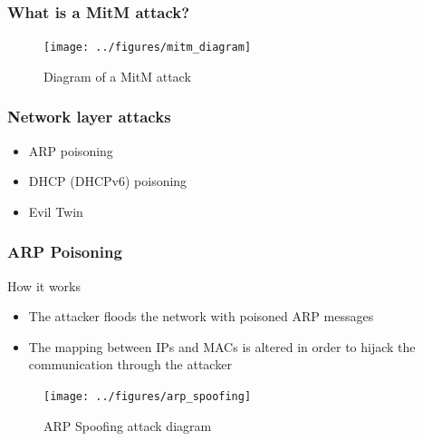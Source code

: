 \documentclass{beamer}
\begin{document}
\begin{frame}
  \frametitle{What is a MitM attack?}
  \begin{figure}
  \texttt{[image: ../figures/mitm\_diagram]}
  \caption*{Diagram of a MitM attack}
  \end{figure}

\end{frame}


\begin{frame}
  \frametitle{Network layer attacks}
  \begin{block}{}
    \begin{itemize}
      \item ARP poisoning
      \item DHCP (DHCPv6) poisoning
      \item Evil Twin
    \end{itemize}
  \end{block}

\end{frame}

\begin{frame}
  \frametitle{ARP Poisoning}
  \begin{block}{How it works}
  \begin{itemize}
    \item The attacker floods the network with poisoned ARP messages
    \item The mapping between IPs and MACs is altered in order to hijack the communication through the attacker
  \end{itemize}
\end{block}
  \begin{figure}
    \texttt{[image: ../figures/arp\_spoofing]}
    \caption*{ARP Spoofing attack diagram}
  \end{figure}
\end{frame}
\end{document}
